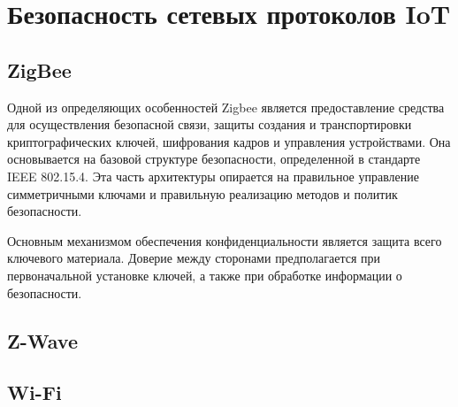 \chapter{Безопасность сетевых протоколов IoT}

	\section{ZigBee}
	Одной из определяющих особенностей Zigbee является предоставление средства для осуществления 
	безопасной связи, защиты создания и транспортировки криптографических ключей, шифрования кадров 
	и управления устройствами. Она основывается на базовой структуре безопасности, определенной в 
	стандарте IEEE 802.15.4. Эта часть архитектуры опирается на правильное управление симметричными 
	ключами и правильную реализацию методов и политик безопасности.
	
	Основным механизмом обеспечения конфиденциальности является защита всего ключевого материала. 
	Доверие между сторонами предполагается при первоначальной установке ключей, а также при обработке 
	информации о безопасности.

	
	\section{Z-Wave}
	
	
	\section{Wi-Fi}